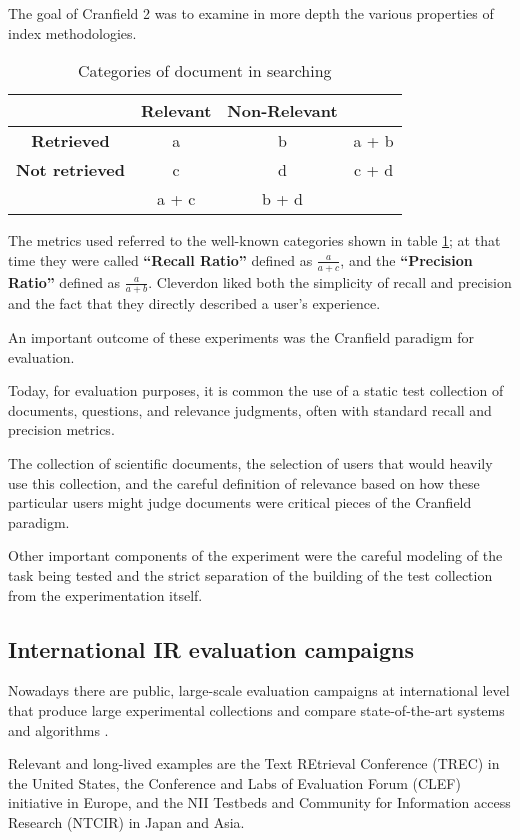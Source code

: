 The goal of Cranfield 2 was to examine in more depth the various properties of index methodologies.

\begin{table}[H]
\centering
\begin{tabular}{ c  c  c | c }
& \textbf{Relevant} & \textbf{Non-Relevant} & \\
\hline
\textbf{Retrieved} & a & b & a + b \\
\textbf{Not retrieved} & c & d & c + d \\ \hline
& a + c & b + d & \\
\hline
\end{tabular}
\caption{Categories of document in searching}
\label{tab:measures}
\end{table}

The metrics used referred to the well-known categories shown in table \ref{tab:measures}; at that time they were called \textbf{``Recall Ratio''} defined as $\frac{a}{a + c}$, and the \textbf{``Precision Ratio''} defined as $\frac{a}{a + b}$. Cleverdon liked both the simplicity of recall and precision and the fact that they directly described a user's experience.

An important outcome of these experiments was the Cranfield paradigm for evaluation.

Today, for evaluation purposes, it is common the use of a static test collection of documents, questions, and relevance judgments, often with standard recall and precision metrics.

The collection of scientific documents, the selection of users that would heavily use this collection, and the careful definition of relevance based on how these particular users might judge documents were critical pieces of the Cranfield paradigm.

Other important components of the experiment were the careful modeling of the task being tested and the strict separation of the building of the test collection from the experimentation itself.

\subsection{International IR evaluation campaigns}

Nowadays there are public, large-scale evaluation campaigns at international level that produce large experimental collections and compare state-of-the-art systems and algorithms \cite{croftIR}.

Relevant and long-lived examples are the Text REtrieval Conference (TREC) \cite{TREC} in the United States, the Conference and Labs of Evaluation Forum (CLEF) initiative in Europe, and the NII Testbeds and Community for Information access Research (NTCIR) in Japan and Asia.

